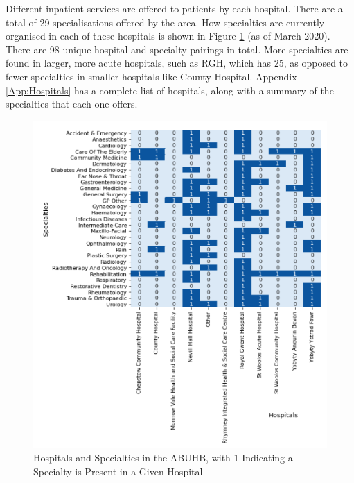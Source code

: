 \documentclass[../thesis.tex]{subfiles}
\begin{document}
Different inpatient services are offered to patients by each hospital. There are a total of 29 specialisations offered by the area. How specialties are currently organised in each of these hospitals is shown in Figure \ref{fig:hospspec} (as of March 2020). There are 98 unique hospital and specialty pairings in total. More specialties are found in larger, more acute hospitals, such as RGH, which has 25, as opposed to fewer specialties in smaller hospitals like County Hospital. Appendix \ref{App:Hospitals} has a complete list of hospitals, along with a summary of the specialties that each one offers.

\begin{figure}[h!]
    \centering
    \includegraphics{Chapters/Chapter1/Figures/Combination Hospitals and Specialties.png}
    \caption{Hospitals and Specialties in the ABUHB, with 1 Indicating a Specialty is Present in a Given Hospital}
    \label{fig:hospspec}
\end{figure}


\end{document}

